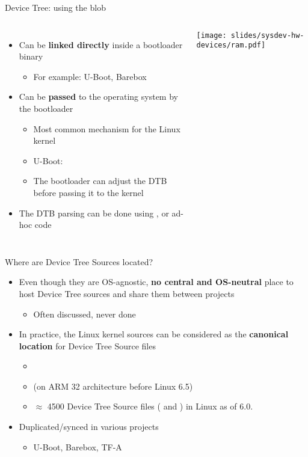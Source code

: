 \begin{frame}{Device Tree: using the blob}
  \begin{columns}[T]
    \begin{itemize}
    \item Can be {\bf linked directly} inside a bootloader binary
      \begin{itemize}
      \item For example: U-Boot, Barebox
      \end{itemize}
    \item Can be {\bf passed} to the operating system by the bootloader
      \begin{itemize}
      \item Most common mechanism for the Linux kernel
      \item U-Boot: 
      \item The bootloader can adjust the DTB before passing it to the
        kernel
      \end{itemize}
    \item The DTB parsing can be done using , or ad-hoc
      code
    \end{itemize}
    \texttt{[image: slides/sysdev-hw-devices/ram.pdf]}
  \end{columns}
\end{frame}

\begin{frame}{Where are Device Tree Sources located?}
  \begin{itemize}
  \item Even though they are OS-agnostic, {\bf no central and
      OS-neutral} place to host Device Tree sources and share them
    between projects
    \begin{itemize}
    \item Often discussed, never done
    \end{itemize}
  \item In practice, the Linux kernel sources can be considered as the
    {\bf canonical location} for Device Tree Source files
    \begin{itemize}
    \item {}
    \item {} (on ARM 32 architecture before Linux 6.5)
    \item $\approx$ 4500 Device Tree Source files ( and
          ) in Linux as of 6.0.
    \end{itemize}
  \item Duplicated/synced in various projects
    \begin{itemize}
    \item U-Boot, Barebox, TF-A
    \end{itemize}
  \end{itemize}
\end{frame}

